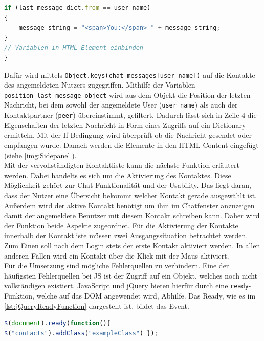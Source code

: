 \documentclass[a4paper,titlepage,halfparskip,12pt]{scrreprt}
\begin{document}
\begin{onehalfspacing}
\begin{lstlisting}[language=Javascript,caption=Hinzufügen von Kontakten,label={lst:HTMLElementsForContaclistfunction}]
if (last_message_dict.from == user_name)
{
	message_string = "<span>You:</span> " + message_string;
}
// Variablen in HTML-Element einbinden
}
\end{lstlisting}
Dafür wird mittels \texttt{Object.keys(chat\_messages[user\_name])} auf die Kontakte des angemeldeten Nutzers zugegriffen. Mithilfe der Variablen \texttt{position\_last\_message\_object} wird aus dem Objekt die Position der letzten Nachricht, bei dem sowohl der angemeldete User (\texttt{user\_name}) als auch der Kontaktpartner (\texttt{peer}) übereinstimmt, gefiltert. Dadurch lässt sich in Zeile 4 die Eigenschaften der letzten Nachricht in Form eines Zugriffs auf ein Dictionary ermitteln. Mit der If-Bedingung wird überprüft ob die Nachricht gesendet oder empfangen wurde. Danach werden die Elemente in den \acs{HTML}-Content eingefügt (siehe \autoref{img:Sidepanel}).\\
Mit der vervollständigten Kontaktliste kann die nächste Funktion erläutert werden. Dabei handelts es sich um die Aktivierung des Kontaktes. Diese Möglichkeit gehört zur Chat-Funktionalität und der Usability. Das liegt daran, dass der Nutzer eine Übersicht bekommt welcher Kontakt gerade ausgewählt ist. Außerdem wird der aktive Kontakt benötigt um ihm im Chatfenster anzuzeigen damit der angemeldete Benutzer mit diesem Kontakt schreiben kann. Daher wird der Funktion beide Aspekte zugeordnet. Für die Aktivierung der Kontakte innerhalb der Kontaktliste müssen zwei Ausgangssituation betrachtet werden. Zum Einen soll nach dem Login stets der erste Kontakt aktiviert werden. In allen anderen Fällen wird ein Kontakt über die Klick mit der Maus aktiviert.\\
Für die Umsetzung sind mögliche Fehlerquellen zu verhindern. Eine der häufigsten Fehlerquellen bei \ac{JS} ist der Zugriff auf ein Objekt, welches noch nicht vollständigen existiert. JavaScript und jQuery bieten hierfür durch eine \texttt{ready}-Funktion, welche auf das \ac{DOM} angewendet wird, Abhilfe. Das \glqq Ready\grqq, wie es im \autoref{lst:jQueryReadyFunction} dargestellt ist, bildet das Event.

\begin{lstlisting}[language=Javascript,caption= Ready() Funktion von jQuery,label={lst:jQueryReadyFunction}]
$(document).ready(function(){
$("contacts").addClass("exampleClass") });
\end{lstlisting}


\end{onehalfspacing}
\end{document}
